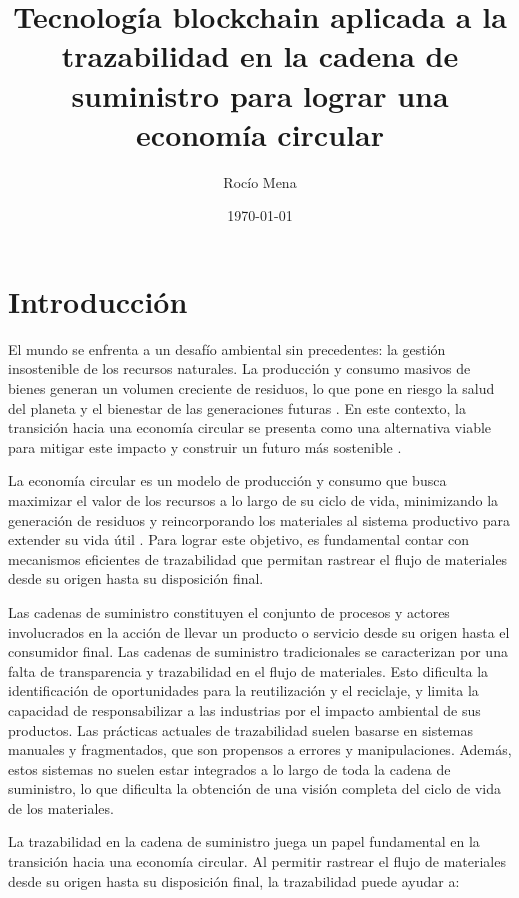 \documentclass[main.tex]{subfiles}
\title{Tecnología blockchain aplicada a la trazabilidad en la cadena de suministro para lograr una economía circular}
\author{Rocío Mena}
\date{\today}
\begin{document}
\maketitle

\section{Introducción}

El mundo se enfrenta a un desafío ambiental sin precedentes: la gestión insostenible de los recursos naturales. La producción y consumo masivos de bienes generan un volumen creciente de residuos, lo que pone en riesgo la salud del planeta y el bienestar de las generaciones futuras \cite{IPCC2022, pelegri2021ipcc}. En este contexto, la transición hacia una economía circular se presenta como una alternativa viable para mitigar este impacto y construir un futuro más sostenible \cite{clima2022book}.

La economía circular es un modelo de producción y consumo que busca maximizar el valor de los recursos a lo largo de su ciclo de vida, minimizando la generación de residuos y reincorporando los materiales al sistema productivo para extender su vida útil \cite{da2022economia, melendez2021economia}. Para lograr este objetivo, es fundamental contar con mecanismos eficientes de trazabilidad que permitan rastrear el flujo de materiales desde su origen hasta su disposición final.

Las cadenas de suministro constituyen el conjunto de procesos y actores involucrados en la acción de llevar un producto o servicio desde su origen hasta el consumidor final. Las cadenas de suministro tradicionales se caracterizan por una falta de transparencia y trazabilidad en el flujo de materiales. Esto dificulta la identificación de oportunidades para la reutilización y el reciclaje, y limita la capacidad de responsabilizar a las industrias por el impacto ambiental de sus productos. Las prácticas actuales de trazabilidad suelen basarse en sistemas manuales y fragmentados, que son propensos a errores y manipulaciones. Además, estos sistemas no suelen estar integrados a lo largo de toda la cadena de suministro, lo que dificulta la obtención de una visión completa del ciclo de vida de los materiales.

La trazabilidad en la cadena de suministro juega un papel fundamental en la transición hacia una economía circular. Al permitir rastrear el flujo de materiales desde su origen hasta su disposición final, la trazabilidad puede ayudar a:
\end{document}
